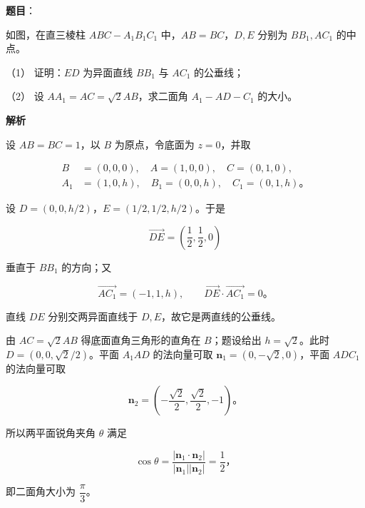\begin{answer}

\textbf{题目}：

如图，在直三棱柱 $ABC-A_1B_1C_1$ 中，$AB=BC$，$D,E$ 分别为 $BB_1,AC_1$ 的中点。
\nopagebreak[4]
\begin{center}\end{center}
\nopagebreak[4]
（1） 证明：$ED$ 为异面直线 $BB_1$ 与 $AC_1$ 的公垂线；

（2） 设 $AA_1=AC=\sqrt2AB$，求二面角 $A_1-AD-C_1$ 的大小。

\textbf{解析}

设 $AB=BC=1$，以 $B$ 为原点，令底面为 $z=0$，并取

\nopagebreak[4]
\[
\begin{aligned}
B&=(0,0,0),\quad A=(1,0,0),\quad C=(0,1,0),\\
A_1&=(1,0,h),\quad B_1=(0,0,h),\quad C_1=(0,1,h)\text{。}
\end{aligned}
\]


设 $D=(0,0,h/2)$，$E=(1/2,1/2,h/2)$。于是

\nopagebreak[4]
\[
\overrightarrow{DE}=\left(\frac12,\frac12,0\right)
\]

垂直于 $BB_1$ 的方向；又

\nopagebreak[4]
\[
\overrightarrow{AC_1}=(-1,1,h),\qquad
\overrightarrow{DE}\cdot\overrightarrow{AC_1}=0\text{。}
\]

直线 $DE$ 分别交两异面直线于 $D,E$，故它是两直线的公垂线。


由 $AC=\sqrt2AB$ 得底面直角三角形的直角在 $B$；题设给出 $h=\sqrt2$。此时 $D=(0,0,\sqrt2/2)$。平面 $A_1AD$ 的法向量可取 $\boldsymbol n_1=(0,-\sqrt2,0)$，平面 $ADC_1$ 的法向量可取

\nopagebreak[4]
\[
\boldsymbol n_2=\left(-\frac{\sqrt2}{2},\frac{\sqrt2}{2},-1\right)\text{。}
\]

所以两平面锐角夹角 $\theta$ 满足

\nopagebreak[4]
\[
\cos\theta=\frac{|\boldsymbol n_1\cdot\boldsymbol n_2|}{|\boldsymbol n_1||\boldsymbol n_2|}=\frac12\text{，}
\]

即二面角大小为 $\dfrac\pi3$。



\end{answer}
